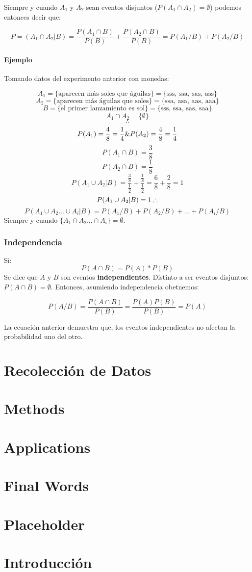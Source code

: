 \documentclass[]{book}
\begin{document}
Siempre y cuando \(A_1\) y \(A_2\) sean eventos disjuntos
(\(P(A_1\cap A_2) = \emptyset\)) podemos entonces decir que:

\[P = (A_1 \cap A_2 \vert B) = \frac {P(A_1 \cap B)}{P(B)}+ \frac {P(A_2 \cap B)}{P(B)} = P(A_1/B) + P(A_2/B)\]

\subsubsection{Ejemplo}\label{ejemplo-1}

Tomando datos del experimento anterior con monedas:

\[A_1 = \{\text{aparecen más soles que águilas}\} = \{\text{sss, ssa, sas, ass}\}\]
\[A_2 = \{\text{aparecen más águilas que soles}\} = \{\text{ssa, asa, aas, aaa}\}\]
\[B = \{\text{el primer lanzamiento es sol}\} = \{\text{sss, ssa, sas, saa}\}\]
\[A_1 \cap A_2 = \{\emptyset\}\] \[\therefore\]
\[P(A_1) = \frac {4}{8} = \frac {1}{4}\space \& \space P(A_2) = \frac {4}{8} = \frac {1}{4}\]
\[P(A_1\cap B) = \frac{3}{8}\] \[P(A_2\cap B) = \frac{1}{8}\]
\[P(A_1\cup A_2\vert B) = \frac {\frac{3}{8}}{\frac{1}{2}} + \frac{\frac{1}{8}}{\frac{1}{2}} = \frac{6}{8} + \frac{2}{8} = 1\]
\[P(A_1\cup A_2\vert B) = 1 \space \therefore\]
\[P(A_1\cup A_2...\cup A_i \vert B) = P(A_1/B) + P(A_2/B)+...+ P(A_i/B)\]
Siempre y cuando \(\{A_1\cap A_2...\cap A_i\}= \emptyset\).

\subsection{Independencia}\label{independencia}

Si: \[P(A\cap B) = P(A)*P(B)\] Se dice que \(A\) y \(B\) son eventos
\textbf{independientes}. Distinto a ser eventos disjuntos:
\(P(A\cap B) = \emptyset\). Entonces, asumiendo independencia obetnemos:

\[P(A/B) = \frac {P(A\cap B)}{P(B)} = \frac{P(A)P(B)}{P(B)} = P(A)\]

La ecuación anterior demuestra que, los eventos independientes no
afectan la probabilidad uno del otro.

\chapter{Recolección de Datos}\label{recoleccion-de-datos}

\chapter{Methods}\label{methods}

\chapter{Applications}\label{applications}

\chapter{Final Words}\label{final-words}

\chapter{Placeholder}\label{placeholder}

\chapter{Introducción}\label{introduccion-1}


\end{document}
